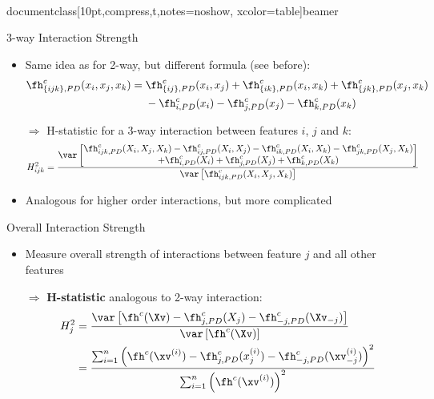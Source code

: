 \\documentclass[10pt,compress,t,notes=noshow, xcolor=table]{beamer}
\begin{document}
\begin{frame}{3-way Interaction Strength}
\begin{itemize}
    \item Same idea as for 2-way, but different formula (see before): %
    \begin{align*}
        \fh^c_{\{ijk\}, PD}(x_i, x_j, x_k)
        =\; & \fh^c_{\{ij\}, PD}(x_i, x_j) + \fh^c_{\{ik\}, PD}(x_i, x_k) + \fh^c_{\{jk\}, PD}(x_j, x_k) \\
        & - \fh^c_{i, PD}(x_i) - \fh^c_{j, PD}(x_j) - \fh^c_{k, PD}(x_k)
    \end{align*}
    \item[$\Rightarrow$] H-statistic for a 3-way interaction between features $i$, $j$ and $k$:
    \begin{align*}
        H^2_{ijk}
        & = \frac{ \var \left[ \substack{\textstyle
        \fh^c_{ijk, PD}(X_i, X_j, X_k)
        - \fh^c_{ij, PD}(X_i, X_j) - \fh^c_{ik, PD}(X_i, X_k) - \fh^c_{jk, PD}(X_j, X_k) \\ \textstyle
        + \fh^c_{i, PD}(X_i) + \fh^c_{j, PD}(X_j) + \fh^c_{k, PD}(X_k)
        }
        \right]
        }{ \var \left[ \fh^c_{ijk, PD}(X_i, X_j, X_k) \right] }
    \end{align*}
    \item Analogous for higher order interactions, but more complicated
\end{itemize}
\end{frame}



\begin{frame}{Overall Interaction Strength}

\begin{itemize}
    \item Measure overall strength of interactions between feature $j$ and all other features
    \item[$\Rightarrow$] \textbf{H-statistic} analogous to 2-way interaction:
    \begin{align*}
        H^2_{j}
        & = \frac{
            \var \left[ \fh^c(\Xv) - \fh^c_{j, PD}(X_j) - \fh^c_{-j, PD}(\Xv_{-j}) \right]
        }{ \var \left[ \fh^c(\Xv) \right] } \\
        & = \frac{
            \sum_{i=1}^n \left( \fh^c(\xv^{(i)}) - \fh^c_{j, PD}(x_j^{(i)}) - \fh^c_{-j, PD}(\xv_{-j}^{(i)})  \right)^2
        }{
            \sum_{i=1}^n \left( \fh^c(\xv^{(i)}) \right)^2
        }
    \end{align*}
\end{itemize}


\end{frame}
\end{document}
